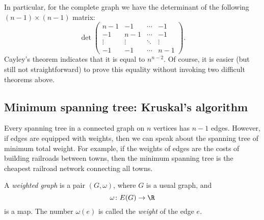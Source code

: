 \begin{page}
\setcounter{section}{2}
\setcounter{subsection}{6}
\setcounter{dfn}{15}
\label{portion:298}


In particular, for the complete graph we have the determinant of the following $(n-1) \times (n-1)$ matrix:
\[
\det
\begin{pmatrix}
n-1 & -1 & \cdots & -1\\
-1 & n-1 & \cdots & -1\\
\vdots & \vdots & \ddots & \vdots\\
-1 & -1 & \cdots & n-1
\end{pmatrix}.
\]
Cayley's theorem indicates that it is equal to $n^{n-2}$.
Of course, it is easier (but still not straightforward) to prove this equality without invoking two difficult theorems above.




\end{page}

\begin{page}
\setcounter{section}{2}
\setcounter{subsection}{6}
\setcounter{dfn}{15}
\label{portion:300}

\subsection{Minimum spanning tree: Kruskal's algorithm}
Every spanning tree in a connected graph on $n$ vertices has $n-1$ edges.
However, if edges are equipped with weights, then we can speak about the spanning tree of minimum total weight.
For example, if the weights of edges are the costs of building railroads between towns,
then the minimum spanning tree is the cheapest railroad network connecting all towns.


\end{page}

\begin{page}
\setcounter{section}{2}
\setcounter{subsection}{6}
\setcounter{dfn}{16}
\label{portion:302}

\begin{dfn}
A \emph{weighted graph} is a pair $(G, \omega)$, where $G$ is a usual graph, and
\[
\omega \colon E(G) \to \R
\]
is a map. The number $\omega(e)$ is called the \emph{weight} of the edge $e$.
\end{dfn}

\end{page}

